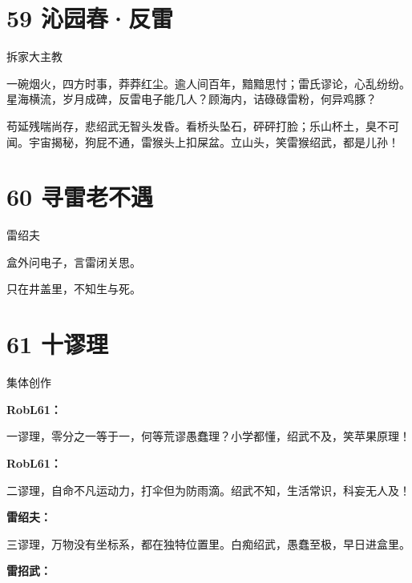 \documentclass[UTF8,12pt,oneside]{ctexbook}
\begin{document}
        
        \section{59 沁园春·反雷}
        \begin{center}
            拆家大主教
        \end{center}
        
        一碗烟火，四方时事，莽莽红尘。逾人间百年，黯黯思忖；雷氏谬论，心乱纷纷。星海横流，岁月成碑，反雷电子能几人？顾海内，诘碌碌雷粉，何异鸡豚？
        
        苟延残喘尚存，悲绍武无智头发昏。看桥头坠石，砰砰打脸；乐山杯土，臭不可闻。宇宙揭秘，狗屁不通，雷猴头上扣屎盆。立山头，笑雷猴绍武，都是儿孙！
        
        \section{60 寻雷老不遇}
        \begin{center}
            雷绍夫
        \end{center}
        \begin{center}
            盒外问电子，言雷闭关思。
            
            只在井盖里，不知生与死。
        \end{center}
        
        \newpage
        
        \section{61 十谬理}
        \begin{center}
            集体创作
        \end{center}
        
        \noindent\textbf{RobL61：}
        
        一谬理，零分之一等于一，何等荒谬愚蠢理？小学都懂，绍武不及，笑苹果原理！
        
        \noindent\textbf{RobL61：}
        
        二谬理，自命不凡运动力，打伞但为防雨滴。绍武不知，生活常识，科妄无人及！
        
        \noindent\textbf{雷绍夫：}
        
        三谬理，万物没有坐标系，都在独特位置里。白痴绍武，愚蠢至极，早日进盒里。
        
        \noindent\textbf{雷招武：}
        
\end{document}
